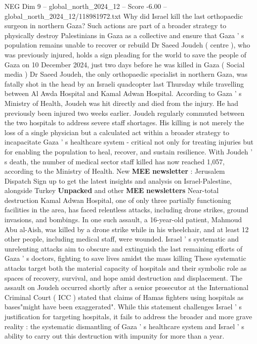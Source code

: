 \begin{textsample}{NEG Dim 9 – global\_north\_2024\_12 – Score -6.00 – global\_north\_2024\_12/118981972.txt}  \label{ex:f9_neg_116}
Why did Israel kill the last orthopaedic surgeon in northern Gaza?
Such actions are part of a broader strategy to physically destroy Palestinians in Gaza as a collective and ensure that Gaza ' s population remains unable to recover or rebuild Dr Saeed Joudeh ( centre ), who was previously injured, holds a sign pleading for the world to save the people of Gaza on 10 December 2024, just two days before he was killed in Gaza ( Social media ) Dr Saeed Joudeh, the only orthopaedic specialist in northern Gaza, was fatally shot in the head by an Israeli quadcopter last Thursday while travelling between Al Awda Hospital and Kamal Adwan Hospital.
According to Gaza ' s Ministry of Health, Joudeh was hit directly and died from the injury.
He had previously been injured two weeks earlier.
Joudeh regularly commuted between the two hospitals to address severe staff shortages.
His killing is not merely the loss of a single physician but a calculated act within a broader strategy to incapacitate Gaza ' s healthcare system - critical not only for treating injuries but for enabling the population to heal, recover, and sustain resilience.
With Joudeh ' s death, the number of medical sector staff killed has now reached 1,057, according to the Ministry of Health.
New \textbf{MEE} \textbf{newsletter} : Jerusalem Dispatch Sign up to get the latest insights and analysis on Israel-Palestine, alongside Turkey \textbf{Unpacked} and other \textbf{MEE} \textbf{newsletters} Near-total destruction Kamal Adwan Hospital, one of only three partially functioning facilities in the area, has faced relentless attacks, including drone strikes, ground invasions, and bombings.
In one such assault, a 16-year-old patient, Mahmoud Abu al-Aish, was killed by a drone strike while in his wheelchair, and at least 12 other people, including medical staff, were wounded.
Israel ' s systematic and unrelenting attacks aim to obscure and extinguish the last remaining efforts of Gaza ' s doctors, fighting to save lives amidst the mass killing These systematic attacks target both the material capacity of hospitals and their symbolic role as spaces of recovery, survival, and hope amid destruction and displacement.
The assault on Joudeh occurred shortly after a senior prosecutor at the International Criminal Court ( ICC ) stated that claims of Hamas fighters using hospitals as bases"might have been exaggerated".
While this statement challenges Israel ' s justification for targeting hospitals, it fails to address the broader and more grave reality : the systematic dismantling of Gaza ' s healthcare system and Israel ' s ability to carry out this destruction with impunity for more than a year.

\end{textsample}
